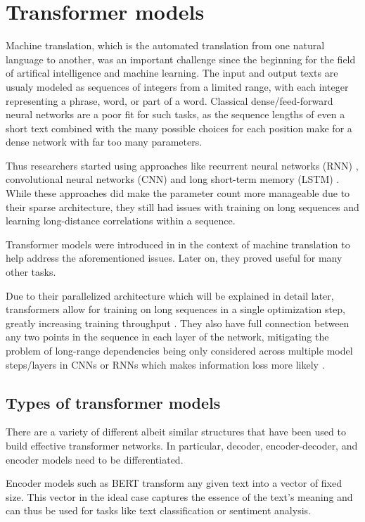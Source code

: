 \section{Transformer models}

Machine translation, which is the automated translation from one natural language to another, was an important challenge since the beginning for the field of artifical intelligence and machine learning.
The input and output texts are usualy modeled as sequences of integers from a limited range, with each integer representing a phrase, word, or part of a word.
Classical dense/feed-forward neural networks are a poor fit for such tasks, as the sequence lengths of even a short text combined with the many possible choices for each position make for a dense network with far too many parameters.

Thus researchers started using approaches like recurrent neural networks (RNN) \cite{phrasereps}, convolutional neural networks (CNN) \cite{convseq} and long short-term memory (LSTM) \cite{seq2seq}.
While these approaches did make the parameter count more manageable due to their sparse architecture, they still had issues with training on long sequences and learning long-distance correlations within a sequence.

Transformer models were introduced in \cite{allyouneed} in the context of machine translation to help address the aforementioned issues. Later on, they proved useful for many other tasks. 

Due to their parallelized architecture which will be explained in detail later, transformers allow for training on long sequences in a single optimization step, greatly increasing training throughput . They also have full connection between any two points in the sequence in each layer of the network, mitigating the problem of long-range dependencies being only considered across multiple model steps/layers in CNNs or RNNs which makes information loss more likely .

\subsection{Types of transformer models}

There are a variety of different albeit similar structures that have been used to build effective transformer networks. In particular, decoder, encoder-decoder, and encoder models need to be differentiated.

Encoder models such as BERT \cite{devlin2019bert} transform any given text into a vector of fixed size. This vector in the ideal case captures the essence of the text's meaning and can thus be used for tasks like text classification or sentiment analysis.

